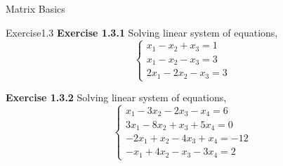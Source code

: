 \documentclass{beamer}
\begin{document}
\begin{section}{Matrix Basics}

\begin{frame}{Exercise1.3}
    \textbf{Exercise 1.3.1} 
    Solving linear system of equations,
        \begin{equation*}
         \begin{cases}
         x_{1}  - x_{2}  + x_{3} = 1 \\
         x_{1}  - x_{2}  - x_{3} = 3 \\ 
         2x_{1} - 2x_{2} - x_{3} = 3 
        \end{cases}
        \end{equation*}

    \textbf{Exercise 1.3.2} 
        Solving linear system of equations,
        \begin{equation*}
        \begin{cases}
             x_{1}  - 3x_{2}  -2x_{3} - x_{4} = 6 \\
             3x_{1}  - 8x_{2}  + x_{3} + 5x_{4}= 0 \\ 
             -2x_{1} + x_{2} - 4x_{3} + x_{4}= -12\\
             -x_{1} + 4x_{2} - x_{3} -3x_{4} = 2 
        \end{cases}
        \end{equation*}
\end{frame}


\end{section}
\end{document}
